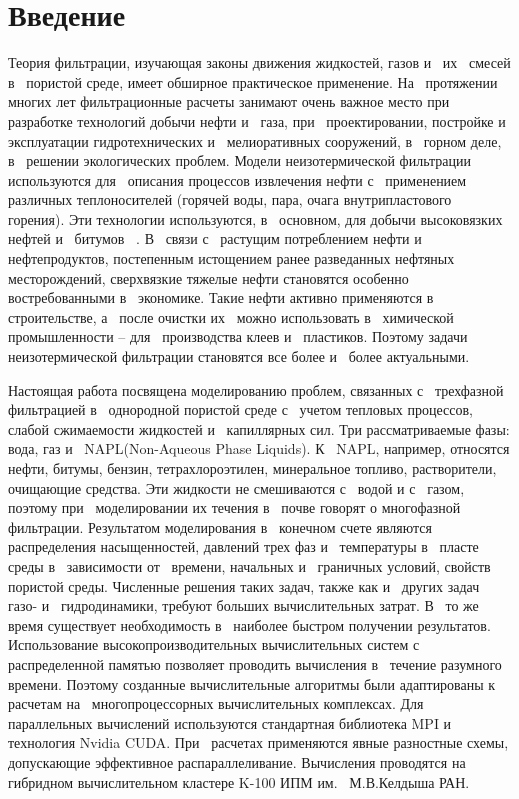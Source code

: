 \section{Введение}
Теория фильтрации, изучающая законы движения жидкостей, газов и~ их~ смесей в~
пористой среде, имеет обширное практическое применение. На~ протяжении многих лет
фильтрационные расчеты занимают очень важное место при~ разработке технологий
добычи нефти и~ газа, при~ проектировании, постройке и эксплуатации
гидротехнических  и~ мелиоративных сооружений, в~ горном деле, в~ решении
экологических проблем.  Модели неизотермической фильтрации используются для~ описания
процессов извлечения нефти
с~ применением различных теплоносителей (горячей воды, пара, очага внутрипластового
горения). Эти технологии используются, в~ основном, для добычи высоковязких нефтей и~ битумов ~\cite{Kanevskaya}.
В~ связи с~ растущим потреблением нефти и~ нефтепродуктов, постепенным истощением ранее разведанных
нефтяных месторождений, сверхвязкие тяжелые нефти становятся особенно востребованными в~ экономике. 
Такие нефти активно применяются в строительстве, а~ после очистки
их~ можно использовать в~ химической промышленности -- для~ производства клеев и~ пластиков.
Поэтому задачи неизотермической фильтрации
становятся все более и~ более актуальными.

Настоящая работа посвящена моделированию проблем, связанных с~ трехфазной фильтрацией 
в~ однородной пористой среде с~ учетом тепловых процессов, слабой сжимаемости жидкостей
и~ капиллярных сил.
Три рассматриваемые фазы: вода, газ и~ NAPL(Non-Aqueous Phase 
Liquids). К~ NAPL, например, относятся нефти, битумы, бензин, тетрахлороэтилен, 
минеральное топливо, растворители, очищающие средства. 
Эти жидкости не смешиваются с~ водой и с~ газом,
поэтому при~ моделировании их течения
в~ почве говорят о многофазной фильтрации.
Результатом моделирования в~ конечном счете являются распределения насыщенностей, давлений
трех фаз и~ температуры в~ пласте среды в~ зависимости от~ времени, начальных и~ граничных
условий, свойств пористой среды. 
Численные решения таких задач, также как и~ других задач газо- и~ гидродинамики,
требуют больших вычислительных затрат. В~ то же время существует необходимость в~
наиболее быстром получении результатов. Использование
высокопроизводительных вычислительных систем с~ распределенной памятью
позволяет проводить вычисления в~ течение разумного времени. Поэтому созданные
вычислительные алгоритмы были адаптированы к~ расчетам на~ многопроцессорных
вычислительных комплексах. Для~ параллельных вычислений используются стандартная
библиотека MPI и~ технология Nvidia CUDA. При~ расчетах применяются явные разностные 
схемы, допускающие эффективное распараллеливание. Вычисления проводятся
на~ гибридном вычислительном кластере K-100 ИПМ им.~ М.В.Келдыша РАН.
